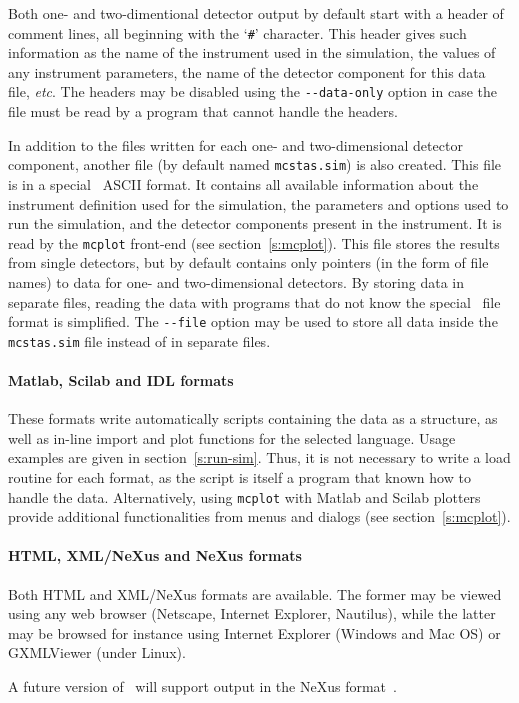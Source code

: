 Both one- and two-dimentional detector output by default start with a
header of comment lines, all beginning with the `\verb+#+' character.
This header gives such information as the name of the instrument used in
the simulation, the values of any instrument parameters, the name of the
detector component for this data file, \textit{etc}. The headers may be
disabled using the \verb+--data-only+ option in case the file must be
read by a program that cannot handle the headers.

In addition to the files written for each one- and two-dimensional
detector component, another file (by default named \verb+mcstas.sim+) is
also created. This file is in a special \MCS\ ASCII format. It contains
all available information about the instrument definition used for the
simulation, the parameters and options used to run the simulation, and
the detector components present in the instrument. It is read by the
\verb+mcplot+ front-end (see section~\ref{s:mcplot}). This file stores
the results from single detectors, but by default contains only pointers
(in the form of file names) to data for one- and two-dimensional
detectors. By storing data in separate files, reading the data with
programs that do not know the special \MCS\ file format is
simplified. The \verb+--file+ option may be used to store all data
inside the \verb+mcstas.sim+ file instead of in separate files.

\paragraph{Matlab, Scilab and IDL formats}

These formats write automatically scripts containing the data as a structure, as well as in-line import and plot functions for the selected language. Usage examples are given in section~\ref{s:run-sim}. 
Thus, it is not necessary to write a load routine for each format, as the script is itself a program that known how to handle the data. Alternatively, using \verb+mcplot+ with Matlab and Scilab plotters provide additional functionalities from menus and dialogs (see section~\ref{s:mcplot}).

\paragraph{HTML, XML/NeXus and NeXus formats}

Both HTML and XML/NeXus formats are available. The former may be viewed using any web browser (Netscape, Internet Explorer, Nautilus), while the latter may be browsed for instance using Internet Explorer (Windows and Mac OS) or GXMLViewer (under Linux).

A future version of \MCS\ will support output in the NeXus
format~\cite{nexus_webpage}.
